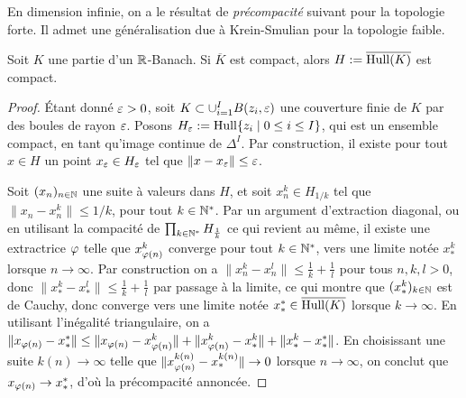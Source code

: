 En dimension infinie, on a le résultat de \emph{précompacité} suivant pour la topologie forte. Il admet une généralisation due à Krein-Smulian pour la topologie faible.

%

\begin{proposition}
\label{prop:hullCompact}
%
	Soit $K$ une partie d'un $\mathbb{R}$-Banach. Si $\overline K$ est compact, alors $H := \overline {\operatorname{Hull}(K)}$ est compact. 
\end{proposition}

\begin{proof}
	Étant donné $\varepsilon>0$, soit $K \subset \cup_{i=1}^I B(z_i,\varepsilon)$ une couverture finie de $K$ par des boules de rayon $\varepsilon$. Posons $H_\varepsilon := \operatorname{Hull}\{z_i \mid 0 \leq i \leq I\}$, qui est un ensemble compact, en tant qu'image continue de $\Delta^I$. Par construction, il existe pour tout $x \in H$ un point $x_\varepsilon \in H_\varepsilon$ tel que $\|x-x_\varepsilon\| \leq \varepsilon$. 
	
	Soit $(x_n)_{n \in \mathbb{N}}$ une suite à valeurs dans $H$, et soit $x_n^k \in H_{1/k}$ tel que $\|x_n - x_n^k\| \leq 1/k$, pour tout $k \in \mathbb{N}^*$. 
	Par un argument d'extraction diagonal, ou en utilisant la compacité de $\prod_{k \in \mathbb{N}^*} H_{\frac 1 k}$ ce qui revient au même, il existe une extractrice $\varphi$ telle que $x_{\varphi(n)}^k$ converge pour tout $k \in \mathbb{N}^*$, vers une limite notée $x_*^k$ lorsque $n \to \infty$.
	Par construction on a $\| x_n^k - x_n^l \| \leq \frac 1 k + \frac 1 l$ pour tous $n,k,l>0$, donc $\|x_*^k - x_*^l\| \leq \frac 1 k + \frac 1 l$ par passage à la limite, ce qui montre que $(x_*^k)_{k \in \mathbb{N}}$ est de Cauchy, donc converge vers une limite notée $x_*^* \in \overline {\operatorname{Hull}(K)}$ lorsque $k \to \infty$.
	En utilisant l'inégalité triangulaire, on a $\|x_{\varphi(n)} - x_*^*\| \leq \|x_{\varphi(n)} - x_{\varphi(n)}^k\| + \|x_{\varphi(n)}^k - x_*^k\| + \|x_*^k-x_*^*\|$. 
	En choisissant %
	une suite $k(n)\to \infty$ telle que $\|x_{\varphi(n)}^{k(n)} - x_*^{k(n)}\| \to 0$ lorsque $n \to \infty$, on conclut que $x_{\varphi(n)} \to x_*^* $, d'où la précompacité annoncée.	
\end{proof}

